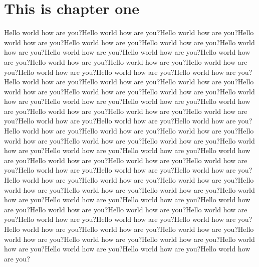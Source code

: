 \chapter{This is chapter one}

Hello world how are you?Hello world how are you?Hello world how are you?Hello world how are you?Hello world how are you?Hello world how are you?Hello world how are you?Hello world how are you?Hello world how are you?Hello world how are you?Hello world how are you?Hello world how are you?Hello world how are you?Hello world how are you?Hello world how are you?Hello world how are you?Hello world how are you?Hello world how are you?Hello world how are you?Hello world how are you?Hello world how are you?Hello world how are you?Hello world how are you?Hello world how are you?Hello world how are you?Hello world how are you?Hello world how are you?Hello world how are you?Hello world how are you?Hello world how are you?Hello world how are you?Hello world how are you?Hello world how are you?Hello world how are you?Hello world how are you?Hello world how are you?Hello world how are you?Hello world how are you?Hello world how are you?Hello world how are you?Hello world how are you?Hello world how are you?Hello world how are you?Hello world how are you?Hello world how are you?Hello world how are you?Hello world how are you?Hello world how are you?Hello world how are you?Hello world how are you?Hello world how are you?Hello world how are you?Hello world how are you?Hello world how are you?Hello world how are you?Hello world how are you?Hello world how are you?Hello world how are you?Hello world how are you?Hello world how are you?Hello world how are you?Hello world how are you?Hello world how are you?Hello world how are you?Hello world how are you?Hello world how are you?Hello world how are you?Hello world how are you?Hello world how are you?Hello world how are you?Hello world how are you?Hello world how are you?Hello world how are you?Hello world how are you?
